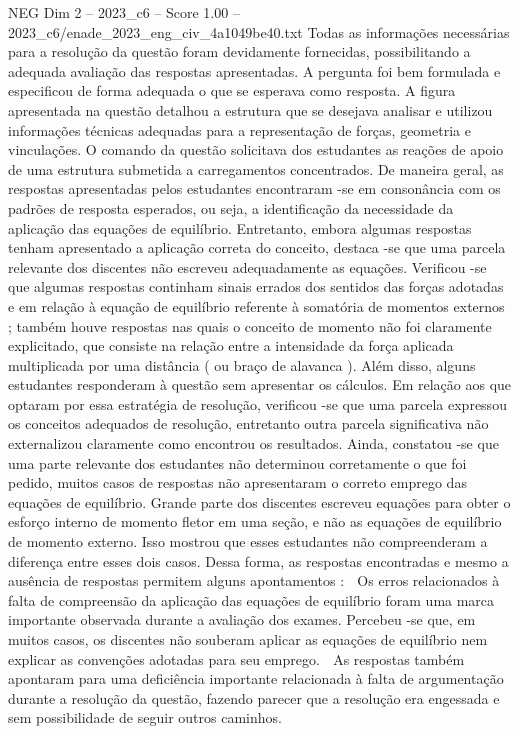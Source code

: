 \begin{textsample}{NEG Dim 2 – 2023\_c6 – Score 1.00 – 2023\_c6/enade\_2023\_eng\_civ\_4a1049be40.txt}
Todas as informações necessárias para a resolução da questão foram devidamente fornecidas, possibilitando a adequada avaliação das respostas apresentadas.
A pergunta foi bem formulada e especificou de forma adequada o que se esperava como resposta.
A figura apresentada na questão detalhou a estrutura que se desejava analisar e utilizou informações técnicas adequadas para a representação de forças, geometria e vinculações.
O comando da questão solicitava dos estudantes as reações de apoio de uma estrutura submetida a carregamentos concentrados.
De maneira geral, as respostas apresentadas pelos estudantes encontraram -se em consonância com os padrões de resposta esperados, ou seja, a identificação da necessidade da aplicação das equações de equilíbrio.
Entretanto, embora algumas respostas tenham apresentado a aplicação correta do conceito, destaca -se que uma parcela relevante dos discentes não escreveu adequadamente as equações.
Verificou -se que algumas respostas continham sinais errados dos sentidos das forças adotadas e em relação à equação de equilíbrio referente à somatória de momentos externos ; também houve respostas nas quais o conceito de momento não foi claramente explicitado, que consiste na relação entre a intensidade da força aplicada multiplicada por uma distância ( ou braço de alavanca ).
Além disso, alguns estudantes responderam à questão sem apresentar os cálculos.
Em relação aos que optaram por essa estratégia de resolução, verificou -se que uma parcela expressou os conceitos adequados de resolução, entretanto outra parcela significativa não externalizou claramente como encontrou os resultados.
Ainda, constatou -se que uma parte relevante dos estudantes não determinou corretamente o que foi pedido, muitos casos de respostas não apresentaram o correto emprego das equações de equilíbrio.
Grande parte dos discentes escreveu equações para obter o esforço interno de momento fletor em uma seção, e não as equações de equilíbrio de momento externo.
Isso mostrou que esses estudantes não compreenderam a diferença entre esses dois casos.
Dessa forma, as respostas encontradas e mesmo a ausência de respostas permitem alguns apontamentos :  Os erros relacionados à falta de compreensão da aplicação das equações de equilíbrio foram uma marca importante observada durante a avaliação dos exames.
Percebeu -se que, em muitos casos, os discentes não souberam aplicar as equações de equilíbrio nem explicar as convenções adotadas para seu emprego.  As respostas também apontaram para uma deficiência importante relacionada à falta de argumentação durante a resolução da questão, fazendo parecer que a resolução era engessada e sem possibilidade de seguir outros caminhos.

\end{textsample}
